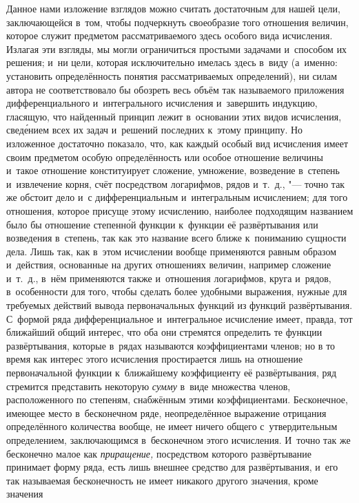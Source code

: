 Данное нами изложение взглядов можно считать достаточным для нашей цели,
заключающейся в~том, чтобы подчеркнуть своеобразие того отношения величин,
которое служит предметом рассматриваемого здесь особого вида исчисления.
Излагая эти взгляды, мы могли ограничиться простыми задачами и~способом их
решения; и~ни цели, которая исключительно имелась здесь в~виду (а~именно:
установить определённость понятия рассматриваемых определений), ни силам автора
не соответствовало бы обозреть весь объём так называемого приложения
дифференциального и~интегрального исчисления и~завершить индукцию, гласящую,
что найденный принцип лежит в~основании этих видов исчисления, свед\'{е}нием всех
их задач и~решений последних к~этому принципу. Но изложенное достаточно
показало, что, как каждый особый вид исчисления имеет своим предметом особую
определённость или особое отношение величины и~такое отношение конституирует
сложение, умножение, возведение в~степень и~извлечение корня, счёт посредством
логарифмов, рядов и~т.~д., "--- точно так же обстоит дело и~с дифференциальным
и~интегральным исчислением; для того отношения, которое присуще этому
исчислению, наиболее подходящим названием было бы отношение степенн\'{о}й
функции к~функции её развёртывания или возведения в~степень, так как это
название всего ближе к~пониманию сущности дела. Лишь так, как в~этом исчислении
вообще применяются равным образом и~действия, основанные на других отношениях
величин, например сложение и~т.~д., в~нём применяются также и~отношения
логарифмов, круга и~рядов, в~особенности для того, чтобы сделать более удобными
выражения, нужные для требуемых действий вывода первоначальных функций из
функций развёртывания. С~формой ряда дифференциальное и~интегральное исчисление
имеет, правда, тот ближайший общий интерес, что оба они стремятся определить те
функции развёртывания, которые в~рядах называются коэффициентами членов; но в
то время как интерес этого исчисления простирается лишь на отношение
первоначальной функции к~ближайшему коэффициенту её развёртывания, ряд
стремится представить некоторую {\em сумму} в~виде множества членов,
расположенного по степеням, снабжённым этими коэффициентами. Бесконечное,
имеющее место в~бесконечном ряде, неопределённое выражение отрицания
определённого количества вообще, не имеет ничего общего с~утвердительным
определением, заключающимся в~бесконечном этого исчисления. И~точно так же
бесконечно малое как {\em приращение,} посредством которого развёртывание
принимает форму ряда, есть лишь внешнее средство для развёртывания, и~его так
называемая бесконечность не имеет никакого другого значения, кроме значения
